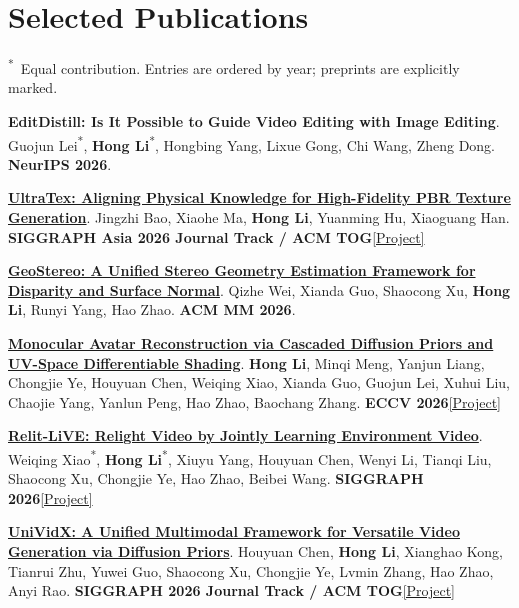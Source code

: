 \documentclass[10pt,a4paper]{article}
\newcommand{\EqContrib}{\textsuperscript{*}}
\newcommand{\reslink}[2]{\href{#1}{\textcolor{accent}{[#2]}}}
\begin{document}
\section{Selected Publications}
{\small\color{muted}\EqContrib~Equal contribution. Entries are ordered by year; preprints are explicitly marked.}
\begin{enumerate}[leftmargin=1.6em,label={[\arabic*]},topsep=6pt,itemsep=7pt,parsep=0pt]
\fontsize{10}{12.5}\selectfont
\item \textbf{EditDistill: Is It Possible to Guide Video Editing with Image Editing}. Guojun Lei\EqContrib, \textbf{Hong Li}\EqContrib, Hongbing Yang, Lixue Gong, Chi Wang, Zheng Dong. \textcolor{accent}{\textbf{NeurIPS 2026}}.

\item \href{https://ultratex.vercel.app/}{\textbf{UltraTex: Aligning Physical Knowledge for High-Fidelity PBR Texture Generation}}. Jingzhi Bao, Xiaohe Ma, \textbf{Hong Li}, Yuanming Hu, Xiaoguang Han. \textcolor{accent}{\textbf{SIGGRAPH Asia 2026 Journal Track / ACM TOG}}\enspace \reslink{https://ultratex.vercel.app/}{Project}

\item \href{https://openreview.net/pdf?id=bemQ8NstY0}{\textbf{GeoStereo: A Unified Stereo Geometry Estimation Framework for Disparity and Surface Normal}}. Qizhe Wei, Xianda Guo, Shaocong Xu, \textbf{Hong Li}, Runyi Yang, Hao Zhao. \textcolor{accent}{\textbf{ACM MM 2026}}.

\item \href{https://luh1124.github.io/MARCUS-Avatar-Projectpage/}{\textbf{Monocular Avatar Reconstruction via Cascaded Diffusion Priors and UV-Space Differentiable Shading}}. \textbf{Hong Li}, Minqi Meng, Yanjun Liang, Chongjie Ye, Houyuan Chen, Weiqing Xiao, Xianda Guo, Guojun Lei, Xuhui Liu, Chaojie Yang, Yanlun Peng, Hao Zhao, Baochang Zhang. \textcolor{accent}{\textbf{ECCV 2026}}\enspace \reslink{https://luh1124.github.io/MARCUS-Avatar-Projectpage/}{Project}

\item \href{https://zhuxing0.github.io/projects/Relit-LiVE/}{\textbf{Relit-LiVE: Relight Video by Jointly Learning Environment Video}}. Weiqing Xiao\EqContrib, \textbf{Hong Li}\EqContrib, Xiuyu Yang, Houyuan Chen, Wenyi Li, Tianqi Liu, Shaocong Xu, Chongjie Ye, Hao Zhao, Beibei Wang. \textcolor{accent}{\textbf{SIGGRAPH 2026}}\enspace \reslink{https://zhuxing0.github.io/projects/Relit-LiVE/}{Project}

\item \href{https://houyuanchen111.github.io/UniVidX.github.io/}{\textbf{UniVidX: A Unified Multimodal Framework for Versatile Video Generation via Diffusion Priors}}. Houyuan Chen, \textbf{Hong Li}, Xianghao Kong, Tianrui Zhu, Yuwei Guo, Shaocong Xu, Chongjie Ye, Lvmin Zhang, Hao Zhao, Anyi Rao. \textcolor{accent}{\textbf{SIGGRAPH 2026 Journal Track / ACM TOG}}\enspace \reslink{https://houyuanchen111.github.io/UniVidX.github.io/}{Project}


\end{enumerate}
\end{document}
